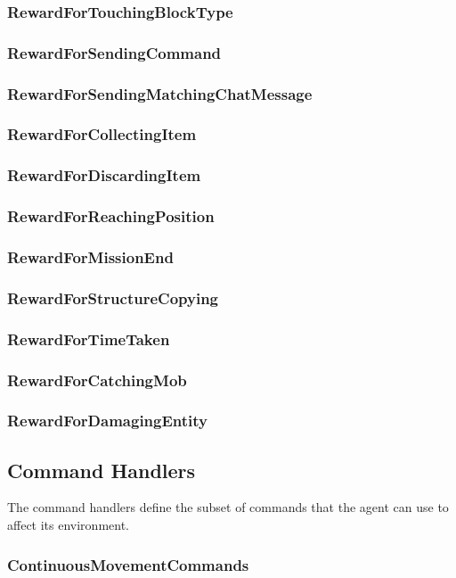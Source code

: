 \documentclass[11pt]{article} %
\begin{document}
\subsubsection{RewardForTouchingBlockType}
\subsubsection{RewardForSendingCommand}
\subsubsection{RewardForSendingMatchingChatMessage}
\subsubsection{RewardForCollectingItem}
\subsubsection{RewardForDiscardingItem}
\subsubsection{RewardForReachingPosition}
\subsubsection{RewardForMissionEnd}
\subsubsection{RewardForStructureCopying}
\subsubsection{RewardForTimeTaken}
\subsubsection{RewardForCatchingMob}
\subsubsection{RewardForDamagingEntity}

\subsection{Command Handlers}
The command handlers define the subset of commands that the agent can use to affect its environment.

\subsubsection{ContinuousMovementCommands}
\end{document}
